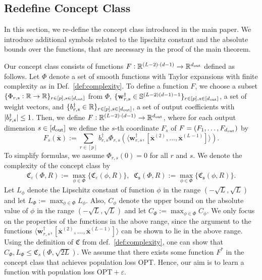 \subsection{Redefine Concept Class}
In this section, we re-define the concept class introduced in the main paper. We introduce additional symbols related to the lipschitz constant and the absolute bounds over the functions, that are necessary in the proof of the main theorem.
\begin{definition}
		Our concept class consists of functions $F: \mathbb{R}^{(L-2) \cdot (d-1)} \rightarrow \mathbb{R}^{d_{\mathrm{out}} }$ defined as follows.
	Let $\Phi$ denote a set of smooth functions with Taylor expansions with finite complexity as in Def.~\ref{def:complexity}. To define a function $F$, we choose a subset $\{\Phi_{r, s}: \mathbb{R} \rightarrow \mathbb{R}\}_{r \in [p], s \in [d_{\mathrm{out}} ]}$ from $\Phi$,  $\{\mathbf{w}_{r, s}^{\dagger} \in \mathbb{S}^{(L-2)(d-1)-1}\}_{r \in[p], s \in[d_{\mathrm{out}} ]}$, a set of weight vectors, and $\{b_{r, s}^{\dagger} \in \mathbb{R}\}_{r \in[p], s \in[d_{\mathrm{out}} ]}$, a set of output coefficients with $\abs[0]{b_{r, s}^\dagger} \leq 1$. Then, we define $F: \mathbb{R}^{(L-2) \cdot (d-1)} \rightarrow \mathbb{R}^{d_{\mathrm{out}} }$, where for each output dimension $s \in [d_{\mathrm{out}} ]$ we define the $s$-th coordinate $F_s$ of $F=(F_1, \ldots, F_{d_{\mathrm{out}} })$ by
	\begin{equation}\label{eq:concept_class_appendix}
		F_s(\overline{\mathbf{x}}) := \sum_{r \in [p]} b_{r, s}^{\dagger} \Phi_{r, s} \left(\langle  \mathbf{w}_{r, s}^{\dagger}, [\overline{\mathbf{x}}^{(2)}, \ldots, \overline{\mathbf{x}}^{(L-1)}]\rangle\right).
	\end{equation}
	To simplify formulas, we assume $\Phi_{r, s}(0)=0$ for all $r$ and $s$. 
	We denote the complexity of the concept class by
	\begin{align*}
		\mathfrak{C}_{\varepsilon}(\Phi, R):=\max_{\phi \in \Phi}\{\mathfrak{C}_{\varepsilon}(\phi, R)\}, \;\;
		\mathfrak{C}_{\mathfrak{s}}(\Phi, R):=\max _{\phi \in \Phi}\{\mathfrak{C}_{\mathfrak{s}}(\phi, R)\}.
	\end{align*}
	 Let $L_{\phi}$ denote the Lipschitz constant of function $\phi$ in the range $(-\sqrt{L}, \sqrt{L})$ and let $L_{\Phi} := \max_{\phi \in \Phi} L_{\phi}$. Also, $C_{\phi}$ denote the upper bound on the absolute value of $\phi$ in the range $(-\sqrt{L}, \sqrt{L})$ and let $C_{\Phi} := \max_{\phi \in \Phi} C_{\phi}$. We only focus on the properties of the functions in the above range, since the argument to the functions $\langle  \mathbf{w}_{r, s}^{\dagger}, [\overline{\mathbf{x}}^{(2)}, \ldots, \overline{\mathbf{x}}^{(L-1)}]\rangle$ can be shown to lie in the above range. Using the definition of $\mathfrak{C}$ from def.~\ref{def:complexity}, one can show that
	$    C_{\Phi}, L_{\Phi} \le \mathfrak{C}_s(\Phi, \sqrt{2L})$.
	We assume that there exists some function $F^{\ast}$ in the concept class that achieves population loss $\mathrm{OPT}$. Hence, our aim is to learn a function with population loss $\mathrm{OPT} + \varepsilon$. 
\end{definition}





